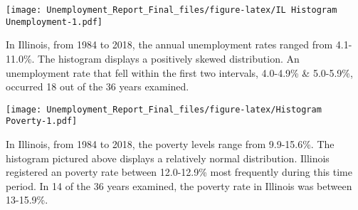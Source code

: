 \documentclass[
]{article}
\newenvironment{Shaded}{\begin{snugshade}}{\end{snugshade}}
\newcommand{\DataTypeTok}[1]{\textcolor[rgb]{0.13,0.29,0.53}{#1}}
\newcommand{\DecValTok}[1]{\textcolor[rgb]{0.00,0.00,0.81}{#1}}
\newcommand{\KeywordTok}[1]{\textcolor[rgb]{0.13,0.29,0.53}{\textbf{#1}}}
\newcommand{\NormalTok}[1]{#1}
\newcommand{\OperatorTok}[1]{\textcolor[rgb]{0.81,0.36,0.00}{\textbf{#1}}}
\newcommand{\StringTok}[1]{\textcolor[rgb]{0.31,0.60,0.02}{#1}}
\begin{document}
\begin{Shaded}
\end{Shaded}

\texttt{[image: Unemployment\_Report\_Final\_files/figure-latex/IL Histogram Unemployment-1.pdf]}

In Illinois, from 1984 to 2018, the annual unemployment rates ranged
from 4.1-11.0\%. The histogram displays a positively skewed
distribution. An unemployment rate that fell within the first two
intervals, 4.0-4.9\% \& 5.0-5.9\%, occurred 18 out of the 36 years
examined.

\begin{Shaded}
\end{Shaded}

\texttt{[image: Unemployment\_Report\_Final\_files/figure-latex/Histogram Poverty-1.pdf]}

In Illinois, from 1984 to 2018, the poverty levels range from
9.9-15.6\%. The histogram pictured above displays a relatively normal
distribution. Illinois registered an poverty rate between 12.0-12.9\%
most frequently during this time period. In 14 of the 36 years examined,
the poverty rate in Illinois was between 13-15.9\%.

\begin{Shaded}
\end{Shaded}
\end{document}
